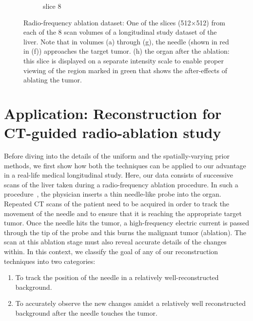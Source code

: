 \documentclass[journal]{IEEEtran}
\begin{document}
\begin{figure}[h!]
\begin{subfigure}[b]{0.24\linewidth}
 \caption{slice 8}
    \end{subfigure}     
     \caption{Radio-frequency ablation dataset: One of the slices (512$\times$512) from each of the 8 scan volumes of a longitudinal study dataset of the liver. Note that in volumes (a) through (g), the needle (shown in red in (f)) approaches the target tumor. (h) the organ after the ablation: this slice is displayed on a separate intensity scale to enable proper viewing of the region marked in green that shows the after-effects of ablating the tumor.} 
\label{fig:RFA2_test_object-prior}
\end{figure}


\section{Application: Reconstruction for CT-guided radio-ablation study}
\label{sec:tmh}
Before diving into the details of the uniform and the
spatially-varying prior methods, we first show how both the
techniques can be applied to our advantage in a real-life medical
longitudinal study. Here, our data consists of successive scans of the liver taken
during a radio-frequency ablation procedure. In such a
procedure~\cite{Dong2015}, the physician inserts a thin needle-like
probe into the organ. Repeated CT scans of the patient need to be
acquired in order to track the movement of the needle and to ensure
that it is reaching the appropriate target tumor. Once the needle hits
the tumor, a high-frequency electric current is passed through the tip
of the probe and this burns the malignant tumor (ablation). The scan
at this ablation stage must also reveal accurate details of the
changes within. In this context, we classify the goal of any of our
reconstruction techniques into two categories: 
\begin{enumerate}
\item To track the position of the needle in a relatively well-reconstructed background.%
\item To accurately observe the new changes amidst a relatively well reconstructed background after the needle touches the tumor.%
\end{enumerate} 
\end{document}
